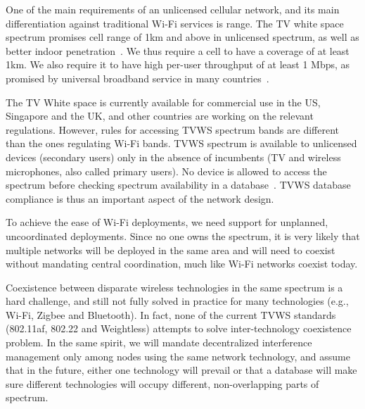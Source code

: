 One of the main requirements of an unlicensed cellular network, and its main differentiation against traditional Wi-Fi services is range. 
The TV white space spectrum promises cell range of 1km and above in unlicensed spectrum, as well as better indoor penetration~\cite{Rice_af}. 
We thus require a cell to have a coverage of at least 1km. 
We also require it to have high per-user throughput of at least 1 Mbps, as promised by universal broadband service in many countries~\cite{uni_broadband}.  

The TV White space is currently available for commercial use in the US, Singapore and the UK, and other countries are working on the relevant regulations. 
However, rules for accessing TVWS spectrum bands are different than the ones regulating Wi-Fi bands. 
TVWS spectrum is available to unlicensed devices (secondary users) only in the absence of incumbents (TV and wireless microphones, also called primary users). 
No device is allowed to access the spectrum before checking spectrum availability in a database~\cite{Rice_af}. 
TVWS database compliance is thus an important aspect of the network design.

To achieve the ease of Wi-Fi deployments, we need support for unplanned, uncoordinated deployments. Since no one owns the spectrum, it is very likely 
that multiple networks will be deployed in the same area and will need to coexist without mandating central coordination, much like Wi-Fi networks coexist today. 

Coexistence between disparate wireless technologies in the same spectrum is a hard challenge, and still not fully solved in practice for many technologies (e.g., Wi-Fi, Zigbee and Bluetooth). In fact, none of the current TVWS standards (802.11af, 802.22 and Weightless) attempts to solve inter-technology coexistence problem. 
In the same spirit, we will mandate decentralized interference management only among nodes using the same network technology, 
and assume that in the future, either one technology will prevail or that a database will make sure different technologies will occupy different, non-overlapping parts of spectrum. 


